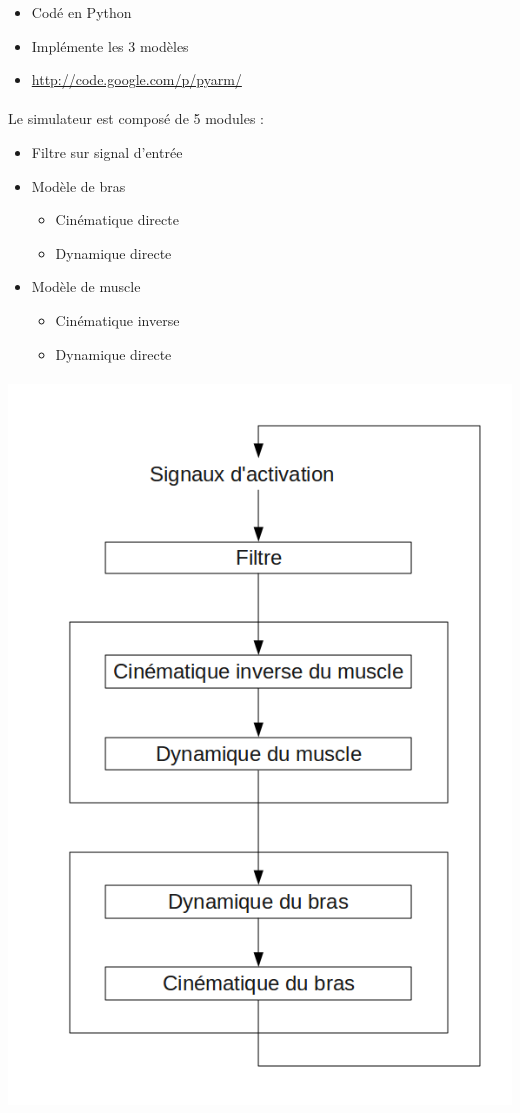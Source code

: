 \documentclass[pdftex,a4paper,11pt]{report}
\numberwithin{equation}{subsection}
\begin{document}
\begin{itemize}
    \item Codé en Python
    \item Implémente les 3 modèles
    \item \url{http://code.google.com/p/pyarm/}
\end{itemize}


\paragraph{}
Le simulateur est composé de 5 modules :
\begin{itemize}
    \item Filtre sur signal d'entrée
    \item Modèle de bras
    \begin{itemize}
        \item Cinématique directe
        \item Dynamique directe
    \end{itemize}
    \item Modèle de muscle
    \begin{itemize}
        \item Cinématique inverse
        \item Dynamique directe
    \end{itemize}
\end{itemize}

\paragraph{}
\begin{center}
        \includegraphics[width=.60\linewidth]{fig/modules}
\end{center}
\end{document}
